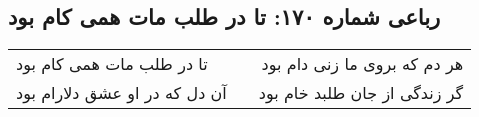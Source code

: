 \begin{center}
\section*{رباعی شماره ۱۷۰: تا در طلب مات همی کام بود}
\label{sec:sh170}
\begin{longtable}{l p{0.5cm} r}
تا در طلب مات همی کام بود
&&
هر دم که بروی ما زنی دام بود
\\
آن دل که در او عشق دلارام بود
&&
گر زندگی از جان طلبد خام بود
\\
\end{longtable}
\end{center}
